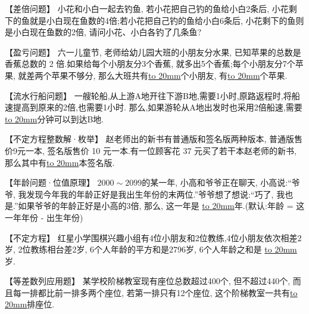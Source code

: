 \item {
    【差倍问题】
    小花和小白一起去钓鱼, 若小花把自己钓的鱼给小白2条后, 小花剩下的鱼就是小白现在鱼数的4倍;若小花把自己钓的鱼给小白6条后, 小花剩下的鱼则是小白现在鱼数的2倍, 请问小花、小白各钓了几条鱼?
    \vspace{2cm}
}

\item {
    【盈亏问题】
    六一儿童节, 老师给幼儿园大班的小朋友分水果, 已知苹果的总数是香蕉总数的 2 倍.如果给每个小朋友分3个香蕉, 就多出5个香蕉;每个小朋友分7个苹果, 就差两个苹果不够分, 那么大班共有\underline{\hbox to 20mm{}}个小朋友, 有\underline{\hbox to 20mm{}}个苹果.
    \vspace{2cm}
}

\item {
    【流水行船问题】
    一艘轮船,从上游A地开往下游B地,需要1小时,原路返程时,将船速提高到原来的2倍,也需要1小时. 那么,如果游轮从A地出发时也采用2倍船速,需要\underline{\hbox to 20mm{}}分钟可以到达B地.
    \vspace{2cm}
}

\item {
    【不定方程整数解·枚举】
    赵老师出的新书有普通版和签名版两种版本, 普通版售价9元一本, 签名版售价 10 元一本.有一位顾客花 37 元买了若干本赵老师的新书, 那么其中有\underline{\hbox to 20mm{}}本签名版.
    \vspace{2cm}
}

\item {
    【年龄问题·位值原理】
    $2000\sim 2099$的某一年, 小高和爷爷正在聊天, 小高说:``爷爷, 我发现今年我的年龄正好是我出生年份的末两位.''爷爷想了想说:``巧了, 我也是.''如果爷爷的年龄正好是小高的3倍, 那么, 这一年是  \underline{\hbox to 20mm{}}年.(默认:年龄 = 这一年年份 - 出生年份)
    \vspace{2cm}
}


\item {
    【不定方程】
    红星小学围棋兴趣小组有4位小朋友和2位教练,4位小朋友依次相差2岁, 2位教练相台差2岁, 6个人年龄的平方和是2796岁, 6个人年龄之和是 \underline{\hbox to 20mm{}} 岁.
    \vspace{2cm}
}

\item {
    【等差数列应用题】
    某学校阶梯教室现有座位总数超过400个, 但不超过440个, 而且每一排都比前一排多两个座位, 若第一排只有12个座位, 这个阶梯教室一共有\underline{\hbox to 20mm{}}排座位.
    \vspace{2cm}
}

